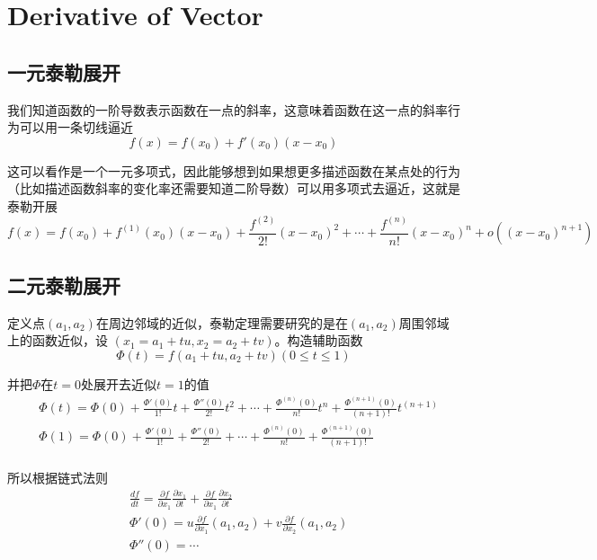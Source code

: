 \chapter{Derivative of Vector}

\section{一元泰勒展开}

我们知道函数的一阶导数表示函数在一点的斜率，这意味着函数在这一点的斜率行为可以用一条切线逼近
\begin{equation}
    f(x)=f(x_0)+f'(x_0)(x-x_0)
\end{equation}

这可以看作是一个一元多项式，因此能够想到如果想更多描述函数在某点处的行为（比如描述函数斜率的变化率还需要知道二阶导数）可以用多项式去逼近，这就是泰勒开展
\begin{equation}
    f(x)=f(x_0)+f^{(1)}(x_0)(x-x_0)+\frac{f^{(2)}}{2!}(x-x_0)^2+\cdots+\frac{f^{(n)}}{n!}(x-x_0)^n+o((x-x_0)^{n+1})
\end{equation}

\section{二元泰勒展开}

定义点$(a_1,a_2)$在周边邻域的近似，泰勒定理需要研究的是在$(a_1,a_2)$周围邻域上的函数近似，设
$(x_1=a_1+tu,x_2=a_2+tv)$。构造辅助函数
\begin{equation}
    \Phi(t)=f(a_1+tu,a_2+tv)(0\leqslant t\leqslant 1)
\end{equation}

并把$\Phi$在$t=0$处展开去近似$t=1$的值
\begin{equation}
    \begin{aligned}
        & \Phi(t)=\Phi(0)+\frac{\Phi'(0)}{1!}t+\frac{\Phi''(0)}{2!}t^2+\cdots+\frac{\Phi^{(n)}(0)}{n!}t^n+\frac{\Phi^{(n+1)}(0)}{(n+1)!}t^{(n+1)}\\
        & \Phi(1)=\Phi(0)+\frac{\Phi'(0)}{1!}+\frac{\Phi''(0)}{2!}+\cdots+\frac{\Phi^{(n)}(0)}{n!}+\frac{\Phi^{(n+1)}(0)}{(n+1)!}\\
    \end{aligned}
\end{equation}

所以根据链式法则
\begin{equation}
    \begin{aligned}
        & \frac{df}{dt}=\frac{\partial f}{\partial x_1}\frac{\partial x_1}{\partial t}+\frac{\partial f}{\partial x_1}\frac{\partial x_2}{\partial t}\\
        & \Phi'(0)=u\frac{\partial f}{\partial x_1}(a_1,a_2)+v\frac{\partial f}{\partial x_2}(a_1,a_2)\\
        & \Phi''(0)=\cdots
    \end{aligned}
\end{equation}

